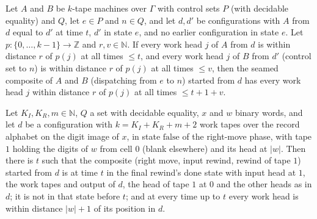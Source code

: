 \begin{lemma}
\label{Complexity.sph_seam_heads}
\leanok
{}
Let $A$ and $B$ be $k$-tape machines over $\Gamma$ with control sets $P$ (with decidable equality)
and $Q$, let $e\in P$ and $n\in Q$, and let $d,d'$ be configurations with $A$ from $d$ equal to $d'$
at time $t$, $d'$ in state $e$, and no earlier configuration in state $e$. Let
$p:\{0,\dots,k-1\}\to\mathbb{Z}$ and $r,v\in\mathbb{N}$. If every work head $j$ of $A$ from $d$ is
within distance $r$ of $p(j)$ at all times $\le t$, and every work head $j$ of $B$ from $d'$ (control
set to $n$) is within distance $r$ of $p(j)$ at all times $\le v$, then the seamed composite of $A$
and $B$ (dispatching from $e$ to $n$) started from $d$ has every work head $j$ within distance $r$
of $p(j)$ at all times $\le t+1+v$.
\end{lemma}

\begin{lemma}
\label{Complexity.sph_rewinds_run}
\leanok
{}
Let $K_I,K_R,m\in\mathbb{N}$, $Q$ a set with decidable equality, $x$ and $w$ binary words, and
let $d$ be a configuration with $k=K_I+K_R+m+2$ work tapes over the record alphabet on the digit
image of $x$, in state $\mathrm{false}$ of the right-move phase, with tape $1$ holding the digits of
$w$ from cell $0$ (blank elsewhere) and its head at $|w|$. Then there is $t$ such that the
composite (right move, input rewind, rewind of tape $1$) started from $d$ is at time $t$ in the
final rewind's done state with input head at $1$, the work tapes and output of $d$, the head of
tape $1$ at $0$ and the other heads as in $d$; it is not in that state before $t$; and at every
time up to $t$ every work head is within distance $|w|+1$ of its position in $d$.
\end{lemma}

